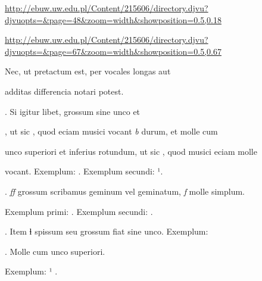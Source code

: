 
\newParkoszpage


{
\url{http://ebuw.uw.edu.pl/Content/215606/directory.djvu?djvuopts=&page=48&zoom=width&showposition=0.5,0.18}

\url{http://ebuw.uw.edu.pl/Content/215606/directory.djvu?djvuopts=&page=67&zoom=width&showposition=0.5,0.67}
}


\fullpreviouslines


{
\color{blue}
Nec, ut pretactum est, per vocales longas aut

}



\splitlines

additas differencia notari potest.

\indentP {}. Si igitur libet,   grossum sine unco et 

\fulllines

, ut sic , quod eciam musici vocant \textit{b} durum, et  molle cum

unco superiori et inferius rotundum, ut sic , quod musici eciam  molle


vocant. Exemplum:   . Exemplum secundi:   ¹.

. \textit{ff} grossum scribamus geminum vel geminatum, \textit{f} molle simplum.

Exemplum primi:   . Exemplum secundi:  .

. Item ɬ spissum seu grossum fiat sine unco. Exemplum:   

    . Molle cum unco superiori.


\splitlines
Exemplum:    ¹  .

